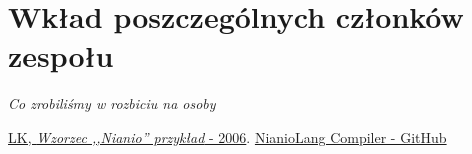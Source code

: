 \documentclass[licencjacka]{pracamgr}
\begin{document}
\chapter{Wkład poszczególnych członków zespołu}
\emph{Co zrobiliśmy w rozbiciu na osoby}


\appendix

\begin{thebibliography}{99}

 \href{https://www.mimuw.edu.pl/~chrzaszc/BPJ20067/nianio.pdf}{LK, \textit{Wzorzec ,,Nianio'' przykład} - 2006}.
 \href{https://github.com/nianiolang/nl}{NianioLang Compiler - GitHub}

\end{thebibliography}
\end{document}
